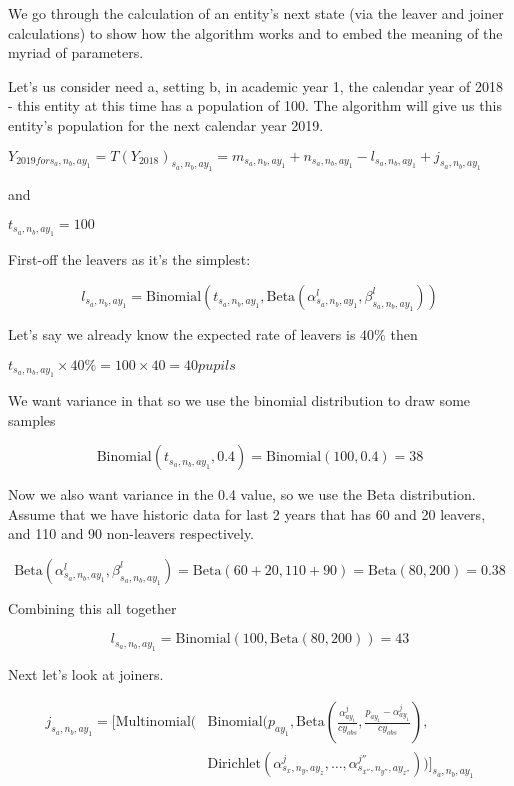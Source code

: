 \documentclass[margin=5mm]{article}
\begin{document}
We go through the calculation of an entity's next state (via the
leaver and joiner calculations) to show how the algorithm works and to
embed the meaning of the myriad of parameters.

Let's us consider need a, setting b, in academic year 1, the calendar
year of 2018 - this entity at this time has a population of 100.  The
algorithm will give us this entity's population for the next calendar
year 2019.

$Y_{2019 for s_a,n_b,ay_1} = T(Y_{2018})_{s_a,n_b,ay_1} = m_{s_a,n_b,ay_1} + n_{s_a,n_b,ay_1} -
l_{s_a,n_b,ay_1} + j_{s_a,n_b,ay_1} $

and

$t_{s_a,n_b,ay_1} = 100$

First-off the leavers as it's the simplest:

\begin{equation*}
l_{s_a,n_b,ay_1} =
  \text{Binomial}(t_{s_a,n_b,ay_1},\text{Beta}(\alpha^l_{s_a,n_b,ay_1},
  \beta^l_{s_a,n_b,ay_1}))
\end{equation*}

Let's say we already know the expected rate of leavers is $40\%$ then

$t_{s_a,n_b,ay_1} \times 40\% = 100 \times 40 = 40 pupils$

We want variance in that so we use the binomial distribution to draw
some samples

\begin{equation*}
  \text{Binomial}(t_{s_a,n_b,ay_1}, 0.4) = \text{Binomial}(100, 0.4) = 38
\end{equation*}

Now we also want variance in the 0.4 value, so we use the Beta
distribution.  Assume that we have historic data for last 2 years that
has 60 and 20 leavers, and 110 and 90 non-leavers respectively.

\begin{equation*}
\text{Beta}(\alpha^l_{s_a,n_b,ay_1}, \beta^l_{s_a,n_b,ay_1}) =
\text{Beta}(60+20,110+90) = \text{Beta}(80,200) = 0.38
\end{equation*}

Combining this all together

\begin{equation*}
l_{s_a,n_b,ay_1} =
  \text{Binomial}(100,\text{Beta}(80,200)) = 43
\end{equation*}

Next let's look at joiners.

\begin{equation*}
  \begin{split}
j_{s_a,n_b,ay_1} = \bigg[\text{Multinomial}( & \text{Binomial}(p_{ay_1},
\text{Beta}(\frac{\alpha^j_{ay_1}}{cy_{obs}},\frac{p_{ay_1} -\alpha^j_{ay_1}}{cy_{obs}}), \\
& \text{Dirichlet}(\alpha^{j}_{s_x,n_y,ay_z}, \dots
, \alpha^{j''}_{s_{x''},n_{y''},ay_{z''}}))\bigg]_{s_a,n_b,ay_1}
  \end{split}
\end{equation*}
\end{document}
